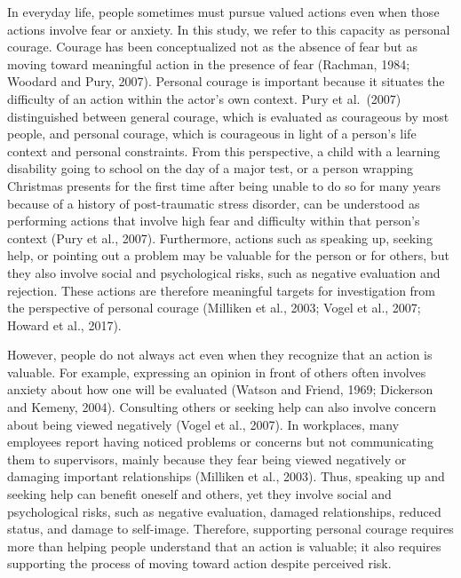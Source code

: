 \documentclass[
]{article}
\begin{document}
In everyday life, people sometimes must pursue valued actions even when
those actions involve fear or anxiety. In this study, we refer to this
capacity as personal courage. Courage has been conceptualized not as the
absence of fear but as moving toward meaningful action in the presence
of fear (Rachman, 1984; Woodard and Pury, 2007). Personal courage is
important because it situates the difficulty of an action within the
actor's own context. Pury et al.~(2007) distinguished between general
courage, which is evaluated as courageous by most people, and personal
courage, which is courageous in light of a person's life context and
personal constraints. From this perspective, a child with a learning
disability going to school on the day of a major test, or a person
wrapping Christmas presents for the first time after being unable to do
so for many years because of a history of post-traumatic stress
disorder, can be understood as performing actions that involve high fear
and difficulty within that person's context (Pury et al., 2007).
Furthermore, actions such as speaking up, seeking help, or pointing out
a problem may be valuable for the person or for others, but they also
involve social and psychological risks, such as negative evaluation and
rejection. These actions are therefore meaningful targets for
investigation from the perspective of personal courage (Milliken et al.,
2003; Vogel et al., 2007; Howard et al., 2017).

However, people do not always act even when they recognize that an
action is valuable. For example, expressing an opinion in front of
others often involves anxiety about how one will be evaluated (Watson
and Friend, 1969; Dickerson and Kemeny, 2004). Consulting others or
seeking help can also involve concern about being viewed negatively
(Vogel et al., 2007). In workplaces, many employees report having
noticed problems or concerns but not communicating them to supervisors,
mainly because they fear being viewed negatively or damaging important
relationships (Milliken et al., 2003). Thus, speaking up and seeking
help can benefit oneself and others, yet they involve social and
psychological risks, such as negative evaluation, damaged relationships,
reduced status, and damage to self-image. Therefore, supporting personal
courage requires more than helping people understand that an action is
valuable; it also requires supporting the process of moving toward
action despite perceived risk.
\end{document}
